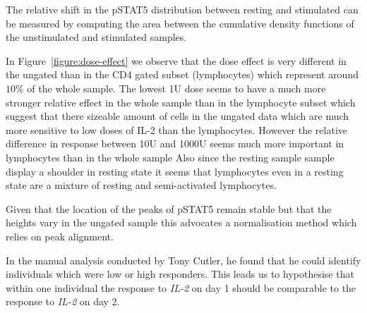 The relative shift in the pSTAT5 distribution between resting and stimulated can be measured by computing the area between the cumulative density functions of the unstimulated and stimulated samples.

In Figure~\ref{figure:dose-effect} we observe that the dose effect is very different in the ungated than in the CD4 gated subset (lymphocytes) which represent around $10\%$ of
the whole sample.
The lowest 1U dose seems to have a much more stronger relative effect in the whole sample than in the lymphocyte subset which suggest that there sizeable amount of cells in the ungated
data which are much more sensitive to low doses of IL-2 than the lymphocytes.
However the relative difference in response between 10U and 1000U seems much more important in lymphocytes than in the whole sample
Also since the resting sample sample display a shoulder in resting state it seems that lymphocytes even in a resting state are a mixture of resting and semi-activated lymphocytes.


Given that the location of the peaks of pSTAT5 remain stable but that the heights vary in the ungated sample this advocates a normalisation method which relies on peak alignment.


In the manual analysis conducted by Tony Cutler, he found that he could identify individuals which were low or high responders.
This leads us to hypothesise that within one individual the response to \emph{IL-2} on day 1 should be comparable to the response to \emph{IL-2} on day 2.




